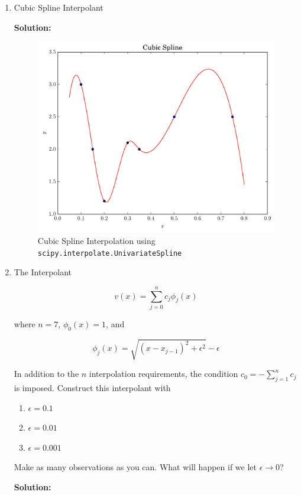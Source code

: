 \documentclass[12pt]{article}
\begin{document}
\begin{enumerate}
\begin{enumerate}
  \item Cubic Spline Interpolant

  {\bf Solution:}

\begin{figure}[H]
\centering
\includegraphics[width=.75\textwidth]{cubic_plot.pdf}
\caption{Cubic Spline Interpolation using {\tt scipy.interpolate.UnivariateSpline}}
\end{figure}

  \item The Interpolant

  \[
      v(x) = \sum_{j=0}^{n}c_{j}\phi_{j}(x)
  \]

  where $n = 7$, $\phi_{0}(x) = 1$, and

  \[
      \phi_{j}(x) = \sqrt{\left( x - x_{j-1}\right)^{2} + \epsilon^{2}} - \epsilon
  \]

  In addition to the $n$ interpolation requirements, the condition $c_{0} = -\sum_{j=1}^{n}c_{j}$
  is imposed. Construct this interpolant with
    \begin{enumerate}
      \item $\epsilon = 0.1$

      \item $\epsilon = 0.01$

      \item $\epsilon = 0.001$
    \end{enumerate}

  Make as many observations as you can. What will happen if we let $\epsilon \rightarrow 0$?

  {\bf Solution:}


\end{enumerate}
\end{enumerate}
\end{document}
